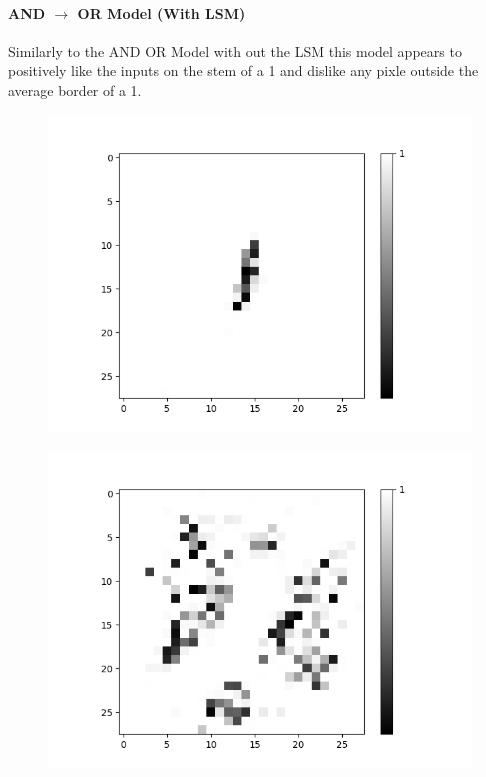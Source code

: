 \paragraph{AND $\rightarrow$ OR Model (With LSM)}
Similarly to the AND OR Model with out the LSM this model appears to positively like the inputs on the stem of a 1 and dislike any pixle outside the average border of a 1.
\begin{figure}[H]
	\captionsetup{labelformat=empty}
	\centering
	\begin{minipage}[b]{0.19\textwidth}
		\includegraphics[width=\textwidth]{AND-OR(W-LSM)(1)/Like/True/Layer0-Neuron-9.png}
		\label{}
	\end{minipage}
	
	\medskip
	
	\begin{minipage}[b]{0.19\textwidth}
		\includegraphics[width=\textwidth]{AND-OR(W-LSM)(1)/Like/False/Layer0-Neuron-9.png}
		\label{}
	\end{minipage}
	\hfill
\end{figure}

